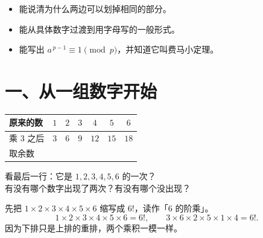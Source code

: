 


\begin{mubiao}
  \begin{itemize}
    \item 能说清为什么两边可以划掉相同的部分。
    \item 能从具体数字过渡到用字母写的一般形式。
    \item 能写出 \(a^{\,p-1}\equiv1\pmod p\)，并知道它叫费马小定理。
  \end{itemize}
\end{mubiao}

\section*{一、从一组数字开始}

\begin{dongshou}[取 \(p=7\)，\(a=3\)，把表填满]
  \begin{center}
  \begin{tabular}{@{}lcccccc@{}}
    \toprule
    原来的数 & \(1\) & \(2\) & \(3\) & \(4\) & \(5\) & \(6\) \\
    \midrule
    乘 \(3\) 之后 & \(3\) & \(6\) & \(9\) & \(12\) & \(15\) & \(18\) \\
    取余数 & & & & & & \\
    \bottomrule
  \end{tabular}
  \end{center}
\end{dongshou}

\begin{sikao}
  看最后一行：它是 \(1,2,3,4,5,6\) 的一次\underline{\hspace{5em}}？\\
  有没有哪个数字出现了两次？有没有哪个没出现？
\end{sikao}

\begin{example}[把两行各自乘起来]
  先把 \(1\times2\times3\times4\times5\times6\) 缩写成 \(6!\)，读作「\(6\) 的阶乘」。
  \[
    1\times2\times3\times4\times5\times6=6!, \qquad
    3\times6\times2\times5\times1\times4=6! .
  \]
  因为下排只是上排的重排，两个乘积一模一样。
\end{example}


